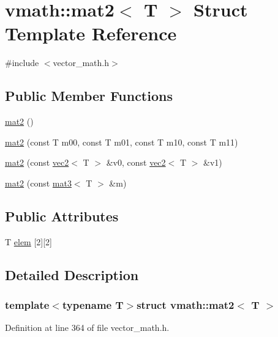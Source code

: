 \hypertarget{structvmath_1_1mat2}{\section{vmath\-:\-:mat2$<$ T $>$ Struct Template Reference}
\label{structvmath_1_1mat2}
}


{\ttfamily \#include $<$vector\-\_\-math.\-h$>$}

\subsection*{Public Member Functions}
\begin{DoxyCompactItemize}
\item 
\hyperlink{structvmath_1_1mat2_a60321ba98a79de1019336270ac16afa9}{mat2} ()
\item 
\hyperlink{structvmath_1_1mat2_afbfeba537a52defce691381c84e9522f}{mat2} (const T m00, const T m01, const T m10, const T m11)
\item 
\hyperlink{structvmath_1_1mat2_a459e1c0a4c39f815041659686e7f4628}{mat2} (const \hyperlink{structvmath_1_1vec2}{vec2}$<$ T $>$ \&v0, const \hyperlink{structvmath_1_1vec2}{vec2}$<$ T $>$ \&v1)
\item 
\hyperlink{structvmath_1_1mat2_a70fb0a62cdefed98a3427fb05d229e53}{mat2} (const \hyperlink{structvmath_1_1mat3}{mat3}$<$ T $>$ \&m)
\end{DoxyCompactItemize}
\subsection*{Public Attributes}
\begin{DoxyCompactItemize}
\item 
T \hyperlink{structvmath_1_1mat2_a199ce32de20f6aef7316a39305baa98e}{elem} \mbox{[}2\mbox{]}\mbox{[}2\mbox{]}
\end{DoxyCompactItemize}


\subsection{Detailed Description}
\subsubsection*{template$<$typename T$>$struct vmath\-::mat2$<$ T $>$}



Definition at line 364 of file vector\-\_\-math.\-h.



